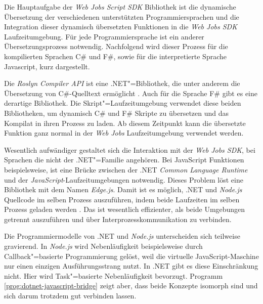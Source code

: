 Die Hauptaufgabe der \textit{Web Jobs Script SDK} Bibliothek ist die dynamische Übersetzung der verschiedenen unterstützten Programmiersprachen und die Integration dieser dynamisch übersetzten Funktionen in die \textit{Web Jobs SDK} Laufzeitumgebung. Für jede Programmiersprache ist ein anderer Übersetzungsprozess notwendig. Nachfolgend wird dieser Prozess für die kompilierten Sprachen C\# und F\#, sowie für die interpretierte Sprache Javascript, kurz dargestellt.

Die \textit{Roslyn Compiler API} ist eine .NET"=Bibliothek, die unter anderem die Übersetzung von C\#-Quelltext ermöglicht \cite[5]{Roslyn}. Auch für die Sprache F\# gibt es eine derartige Bibliothek. Die Skript"=Laufzeitumgebung verwendet diese beiden Bibliotheken, um dynamisch C\# und F\# Skripte zu übersetzen und das Kompilat in ihren Prozess zu laden. Ab diesem Zeitpunkt kann die übersetzte Funktion ganz normal in der \textit{Web Jobs} Laufzeitumgebung verwendet werden.

Wesentlich aufwändiger gestaltet sich die Interaktion mit der \textit{Web Jobs SDK}, bei Sprachen die nicht der .NET"=Familie angehören. Bei JavaScript Funktionen beispielsweise, ist eine Brücke zwischen der .NET \textit{Common Language Runtime} und der \textit{JavaScript}-Laufzeitumgebungen notwendig. Dieses Problem löst eine Bibliothek mit dem Namen \textit{Edge.js}. Damit ist es möglich, .NET und \textit{Node.js} Quellcode im selben Prozess auszuführen, indem beide Laufzeiten im selben Prozess geladen werden \cite{EdgeJs}. Das ist wesentlich effizienter, als beide Umgebungen getrennt auszuführen und über Interprozesskommunikation zu verbinden.

Die Programmiermodelle von .NET und \textit{Node.js} unterscheiden sich teilweise gravierend. In \textit{Node.js} wird Nebenläufigkeit beispielsweise durch Callback"=basierte Programmierung gelöst, weil die virtuelle JavaScript-Maschine nur einen einzigen Ausführungsstrang nutzt. In .NET gibt es diese Einschränkung nicht. Hier wird Task"=basierte Nebenläufigkeit bevorzugt. Programm \ref{prog:dotnet-javascript-bridge} zeigt aber, dass beide Konzepte isomorph sind und sich darum trotzdem gut verbinden lassen.

